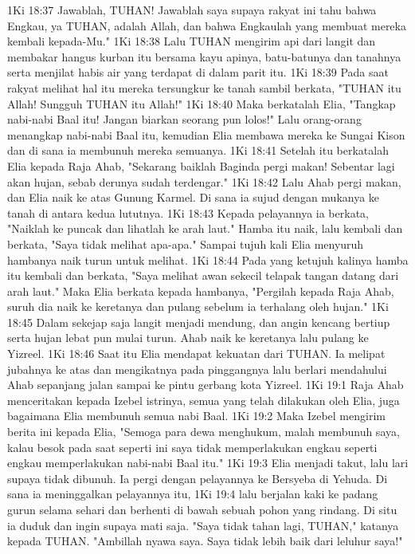 1Ki 18:37  Jawablah, TUHAN! Jawablah saya supaya rakyat ini tahu bahwa Engkau, ya TUHAN, adalah Allah, dan bahwa Engkaulah yang membuat mereka kembali kepada-Mu."
1Ki 18:38  Lalu TUHAN mengirim api dari langit dan membakar hangus kurban itu bersama kayu apinya, batu-batunya dan tanahnya serta menjilat habis air yang terdapat di dalam parit itu.
1Ki 18:39  Pada saat rakyat melihat hal itu mereka tersungkur ke tanah sambil berkata, "TUHAN itu Allah! Sungguh TUHAN itu Allah!"
1Ki 18:40  Maka berkatalah Elia, "Tangkap nabi-nabi Baal itu! Jangan biarkan seorang pun lolos!" Lalu orang-orang menangkap nabi-nabi Baal itu, kemudian Elia membawa mereka ke Sungai Kison dan di sana ia membunuh mereka semuanya.
1Ki 18:41  Setelah itu berkatalah Elia kepada Raja Ahab, "Sekarang baiklah Baginda pergi makan! Sebentar lagi akan hujan, sebab derunya sudah terdengar."
1Ki 18:42  Lalu Ahab pergi makan, dan Elia naik ke atas Gunung Karmel. Di sana ia sujud dengan mukanya ke tanah di antara kedua lututnya.
1Ki 18:43  Kepada pelayannya ia berkata, "Naiklah ke puncak dan lihatlah ke arah laut." Hamba itu naik, lalu kembali dan berkata, "Saya tidak melihat apa-apa." Sampai tujuh kali Elia menyuruh hambanya naik turun untuk melihat.
1Ki 18:44  Pada yang ketujuh kalinya hamba itu kembali dan berkata, "Saya melihat awan sekecil telapak tangan datang dari arah laut." Maka Elia berkata kepada hambanya, "Pergilah kepada Raja Ahab, suruh dia naik ke keretanya dan pulang sebelum ia terhalang oleh hujan."
1Ki 18:45  Dalam sekejap saja langit menjadi mendung, dan angin kencang bertiup serta hujan lebat pun mulai turun. Ahab naik ke keretanya lalu pulang ke Yizreel.
1Ki 18:46  Saat itu Elia mendapat kekuatan dari TUHAN. Ia melipat jubahnya ke atas dan mengikatnya pada pinggangnya lalu berlari mendahului Ahab sepanjang jalan sampai ke pintu gerbang kota Yizreel.
1Ki 19:1  Raja Ahab menceritakan kepada Izebel istrinya, semua yang telah dilakukan oleh Elia, juga bagaimana Elia membunuh semua nabi Baal.
1Ki 19:2  Maka Izebel mengirim berita ini kepada Elia, "Semoga para dewa menghukum, malah membunuh saya, kalau besok pada saat seperti ini saya tidak memperlakukan engkau seperti engkau memperlakukan nabi-nabi Baal itu."
1Ki 19:3  Elia menjadi takut, lalu lari supaya tidak dibunuh. Ia pergi dengan pelayannya ke Bersyeba di Yehuda. Di sana ia meninggalkan pelayannya itu,
1Ki 19:4  lalu berjalan kaki ke padang gurun selama sehari dan berhenti di bawah sebuah pohon yang rindang. Di situ ia duduk dan ingin supaya mati saja. "Saya tidak tahan lagi, TUHAN," katanya kepada TUHAN. "Ambillah nyawa saya. Saya tidak lebih baik dari leluhur saya!"
